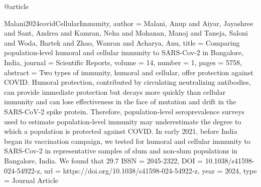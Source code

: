 @article{Malani2024covidCellularImmunity,
   author = {Malani, Anup and Aiyar, Jayashree and Sant, Andrea and Kamran, Neha and Mohanan, Manoj and Taneja, Saloni and Woda, Bartek and Zhao, Wanran and Acharya, Anu},
   title = {Comparing population-level humoral and cellular immunity to SARS-Cov-2 in Bangalore, India},
   journal = {Scientific Reports},
   volume = {14},
   number = {1},
   pages = {5758},
   abstract = {Two types of immunity, humoral and cellular, offer protection against COVID. Humoral protection, contributed by circulating neutralizing antibodies, can provide immediate protection but decays more quickly than cellular immunity and can lose effectiveness in the face of mutation and drift in the SARS-CoV-2 spike protein. Therefore, population-level seroprevalence surveys used to estimate population-level immunity may underestimate the degree to which a population is protected against COVID. In early 2021, before India began its vaccination campaign, we tested for humoral and cellular immunity to SARS-Cov-2 in representative samples of slum and non-slum populations in Bangalore, India. We found that 29.7%
   ISSN = {2045-2322},
   DOI = {10.1038/s41598-024-54922-z},
   url = {https://doi.org/10.1038/s41598-024-54922-z},
   year = {2024},
   type = {Journal Article}
}

}
